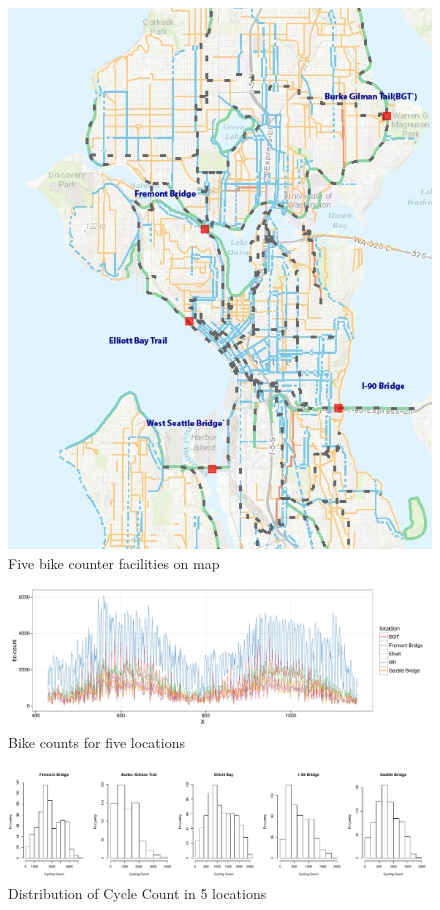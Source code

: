 \documentclass [11pt, proquest] {uwthesis}[2015/03/03]
\begin{document}
\begin{figure}
  \includegraphics[width=1\textwidth]{figures/5sites/5locations} 
 \caption{Five bike counter facilities on map}
 \label{fig:5locations}
\end{figure}

\begin{figure}
  \includegraphics[width=1\textwidth]{figures/5sites/5location_time} 
 \caption{Bike counts for five locations}
 \label{fig:5locations_time}
\end{figure}

\begin{figure}
  \includegraphics[width=1\textwidth]{figures/5sites/distribution5} 
 \caption{Distribution of Cycle Count in 5 locations }
 \label{fig:distribution5}
\end{figure}
\end{document}
